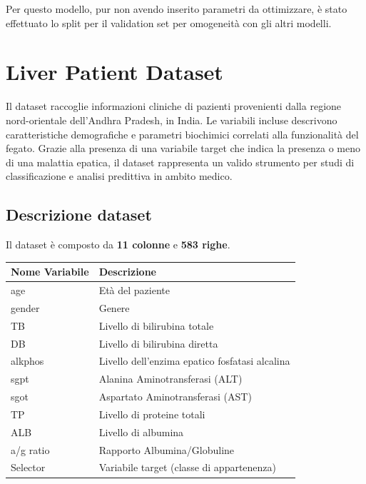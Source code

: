 \documentclass{article}
\begin{document}
Per questo modello, pur non avendo inserito parametri da ottimizzare, è stato effettuato lo split per il validation set per omogeneità con gli altri modelli.

\newpage


\section{Liver Patient Dataset}

Il dataset raccoglie informazioni cliniche di pazienti provenienti dalla regione nord-orientale dell'Andhra Pradesh, in India. Le variabili incluse descrivono caratteristiche demografiche e parametri biochimici correlati alla funzionalità del fegato. Grazie alla presenza di una variabile target che indica la presenza o meno di una malattia epatica, il dataset rappresenta un valido strumento per studi di classificazione e analisi predittiva in ambito medico.

\subsection{Descrizione dataset}

Il dataset è composto da \textbf{11 colonne} e \textbf{583 righe}.

\begin{table}[htbp]
\centering
\label{tab:featuresLiver}
\begin{tabular}{ll}
\hline
\textbf{Nome Variabile} & \textbf{Descrizione} \\
\hline
age & Età del paziente \\
gender & Genere \\
TB & Livello di bilirubina totale \\
DB & Livello di bilirubina diretta \\
alkphos & Livello dell'enzima epatico fosfatasi alcalina \\
sgpt & Alanina Aminotransferasi (ALT) \\
sgot & Aspartato Aminotransferasi (AST) \\
TP & Livello di proteine totali \\
ALB & Livello di albumina \\
a/g ratio & Rapporto Albumina/Globuline \\
Selector & Variabile target (classe di appartenenza) \\
\hline
\end{tabular}
\end{table}
\end{document}
